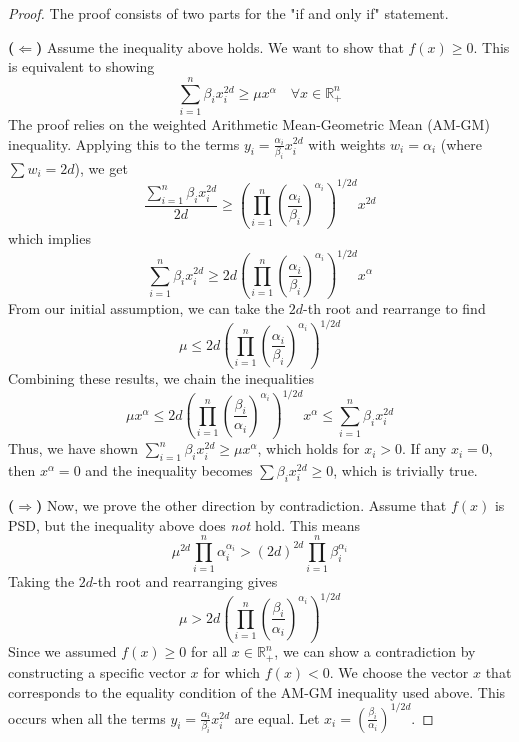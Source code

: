 \documentclass{article}
\begin{document}
\begin{proof}
The proof consists of two parts for the "if and only if" statement.

	\textbf{(\(\Leftarrow\))} Assume the inequality above holds. We want to show that $f(x) \geq 0$. This is equivalent to showing
\[
   \sum_{i=1}^n \beta_i x_i^{2d} \geq \mu x^{\alpha} \quad \forall x \in \mathbb{R}_+^n
\]
The proof relies on the weighted Arithmetic Mean-Geometric Mean (AM-GM) inequality. Applying this to the terms
$y_i = \frac{\alpha_i}{\beta_i} x_i^{2d}$ with weights $w_i = \alpha_i$ (where $\sum w_i = 2d$), we get
\[
   \frac{\sum_{i=1}^n \beta_i x_i^{2d}}{2d} \geq \left( \prod_{i=1}^n \left( \frac{\alpha_i}{\beta_i} \right)^{\alpha_i} \right)^{1/2d} x^{2d}
\]
which implies
\[
   \sum_{i=1}^n \beta_i x_i^{2d} \geq 2d \left( \prod_{i=1}^n \left( \frac{\alpha_i}{\beta_i} \right)^{\alpha_i} \right)^{1/2d} x^{\alpha}
\]
From our initial assumption, we can take the $2d$-th root and rearrange to find
\[
   \mu \leq 2d \left( \prod_{i=1}^n \left( \frac{\alpha_i}{\beta_i} \right)^{\alpha_i} \right)^{1/2d}
\]
Combining these results, we chain the inequalities
\[
   \mu x^{\alpha} \leq 2d \left( \prod_{i=1}^n \left( \frac{\beta_i}{\alpha_i} \right)^{\alpha_i} \right)^{1/2d} x^{\alpha} \leq \sum_{i=1}^n \beta_i x_i^{2d}
\]
Thus, we have shown $\sum_{i=1}^n \beta_i x_i^{2d} \geq \mu x^{\alpha}$, which holds for $x_i > 0$. If any $x_i = 0$,
then $x^{\alpha} = 0$ and the inequality becomes $\sum \beta_i x_i^{2d} \geq 0$, which is trivially true.

	\textbf{(\(\Rightarrow\))} Now, we prove the other direction by contradiction. Assume that $f(x)$ is PSD, but the
   inequality above does \emph{not} hold. This means
\[
   \mu^{2d} \prod_{i=1}^n \alpha_i^{\alpha_i} > (2d)^{2d} \prod_{i=1}^n \beta_i^{\alpha_i}
\]
Taking the $2d$-th root and rearranging gives
\[
   \mu > 2d \left( \prod_{i=1}^n \left( \frac{\beta_i}{\alpha_i} \right)^{\alpha_i} \right)^{1/2d}
\]
Since we assumed $f(x) \geq 0$ for all $x \in \mathbb{R}_+^n$, we can show a contradiction by constructing a specific
vector $x$ for which $f(x) < 0$. We choose the vector $x$ that corresponds to the equality condition of the AM-GM inequality
used above. This occurs when all the terms $y_i = \frac{\alpha_i}{\beta_i} x_i^{2d}$ are equal.
Let $x_i = \left( \frac{\beta_i}{\alpha_i} \right)^{1/2d}$.


\end{proof}
\end{document}
